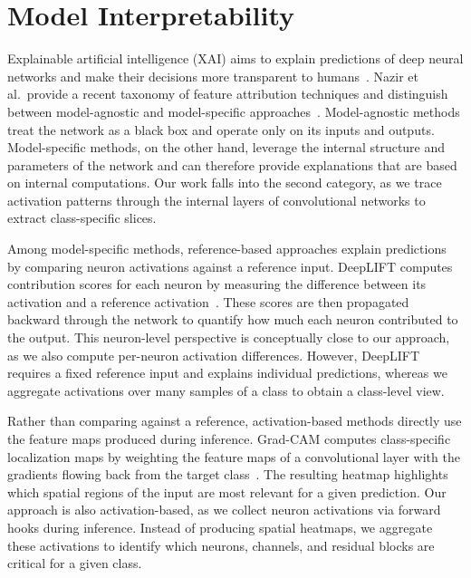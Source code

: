 \documentclass[
12pt,
fancyheadings,
a4paper,
twoside,
BCOR=0.7cm,
nobcorignoretitle,
grayscalebody,
]{stsreprt}
\begin{document}
\section{Model Interpretability}
\label{sec:rw-interpretability}


Explainable artificial intelligence (XAI) aims to explain predictions of deep neural networks and
make their decisions more transparent to humans~\cite{Samek_2021,samek2017understanding}.
Nazir et al.\ provide a recent taxonomy of feature attribution techniques and distinguish between
model-agnostic and model-specific approaches~\cite{nazir2025survey}.
Model-agnostic methods treat the network as a black box and operate only on its inputs and outputs.
Model-specific methods, on the other hand, leverage the internal structure and parameters of the
network and can therefore provide explanations that are based on internal computations.
Our work falls into the second category, as we trace activation patterns through the internal
layers of convolutional networks to extract class-specific slices.

Among model-specific methods, reference-based approaches explain predictions by comparing neuron
activations against a reference input.
DeepLIFT computes contribution scores for each neuron by measuring the difference between its
activation and a reference activation~\cite{shrikumar2017deeplift}.
These scores are then propagated backward through the network to quantify how much each neuron
contributed to the output.
This neuron-level perspective is conceptually close to our approach, as we also compute per-neuron
activation differences.
However, DeepLIFT requires a fixed reference input and explains individual predictions, whereas we
aggregate activations over many samples of a class to obtain a class-level view.

Rather than comparing against a reference, activation-based methods directly use the feature maps
produced during inference.
Grad-CAM computes class-specific localization maps by weighting the feature maps of a convolutional
layer with the gradients flowing back from the target class~\cite{selvaraju2017gradcam}.
The resulting heatmap highlights which spatial regions of the input are most relevant for a given
prediction.
Our approach is also activation-based, as we collect neuron activations via forward hooks during
inference.
Instead of producing spatial heatmaps, we aggregate these activations to identify which neurons,
channels, and residual blocks are critical for a given class.
\end{document}
